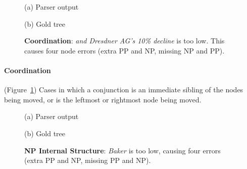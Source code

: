 \begin{figure}
\begin{center}

\vspace{3mm}
(a) Parser output

\vspace{6mm}


\vspace{3mm}
(b) Gold tree
\end{center}
\derivspace
\caption[Error analysis example: coordination.]{ \label{fig:coordination} 
	\textbf{Coordination}: \emph{and Dresdner AG's 10\% decline} is too low.
	This causes four node errors (extra PP and NP, missing NP and PP).
}
\derivaftercompress
\end{figure}

\paragraph{Coordination} (Figure~\ref{fig:coordination}) 
Cases in which a conjunction is an immediate sibling of the nodes being moved, or is the leftmost or rightmost node being moved.

\begin{figure}
\begin{center}

\vspace{3mm}
(a) Parser output

\vspace{6mm}


\vspace{3mm}
(b) Gold tree
\end{center}
\derivspace
\caption[Error analysis example: NP internal structure.]{ \label{fig:NP-internal-structure} 
	\textbf{NP Internal Structure}: \emph{Baker} is too low, causing four
	errors (extra PP and NP, missing PP and NP).
}
\derivaftercompress
\end{figure}

